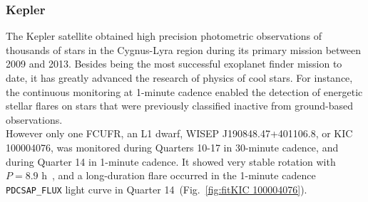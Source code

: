 \documentclass[fleqn,usenatbib,letters]{mnras}%
\newcommand{\FE}{KIC 100004076} %
\begin{document}
\subsubsection{Kepler}
\label{sec:photometryKepler}
The Kepler \citep{koch2010} satellite obtained high precision photometric observations of thousands of stars in the Cygnus-Lyra region during its primary mission between 2009 and 2013. Besides being the most successful exoplanet finder mission to date, it has greatly advanced the research of physics of cool stars. For instance, the continuous monitoring at 1-minute cadence enabled the detection of energetic stellar flares on stars that were previously classified inactive from ground-based observations.
\\
However
only one FCUFR, an L1 dwarf, WISEP J190848.47+401106.8, or \FE, was monitored during Quarters 10-17 in 30-minute cadence, and during Quarter 14 in 1-minute cadence. It showed very stable rotation with $P=8.9$ h~\citep{gizis2013}, 
and a long-duration flare occurred in the 1-minute cadence \texttt{PDCSAP\_FLUX} light curve in Quarter 14~(Fig.~\ref{fig:fit\FE}).
\end{document}
